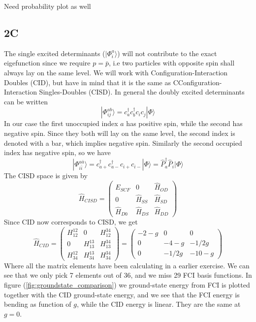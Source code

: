 \documentclass[norsk,a4paper,12pt]{article}
\begin{document}
Need probability plot as well

\subsection*{2C}
The single excited determinants ($|\Phi_i^a\rangle$) will not contribute to the exact eigefunction since we require $p=\bar{p}$, i.e two particles with opposite spin shall always lay on the same level. We will work with Configuration-Interaction Doubles (CID), but have in mind that it is the same as CConfiguration-Interaction Singles-Doubles (CISD). In general the doubly excited determinants can be written
\begin{equation}
|\Phi_{ij}^{ab}\rangle=c_a^{\dagger}c_b^{\dagger}c_ic_j|\Phi\rangle
\end{equation}
In our case the first unoccupied index $a$ has positive spin, while the second has negative spin. Since they both will lay on the same level, the second index is denoted with a bar, which implies negative spin. Similarly the second occupied index has negative spin, so we have
\begin{equation}
|\Phi_{i\bar{i}}^{a\bar{a}}\rangle=c_{a+}^{\dagger}c_{a-}^{\dagger}c_{i+}c_{i-}|\Phi\rangle=\hat{P}_a^{\dagger}\hat{P}_i|\Phi\rangle
\end{equation}
The CISD space is given by
\begin{equation}
\hat{H}_{CISD}=\begin{pmatrix}
E_{SCF}&0&\hat{H}_{OD}\\
0&\hat{H}_{SS}&\hat{H}_{SD}\\
\hat{H}_{D0}&\hat{H}_{DS}&\hat{H}_{DD}
\end{pmatrix}
\end{equation}
Since CID now corresponds to CISD, we get
\begin{equation}
\hat{H}_{CID}=\begin{pmatrix}
H_{12}^{12}&0&H_{12}^{34}\\
0&H_{13}^{13}&H_{13}^{34}\\
H_{34}^{12}&H_{34}^{13}&H_{34}^{34}
\end{pmatrix}=
\begin{pmatrix}
-2-g&0&0\\
0&-4-g&-1/2g\\
0&-1/2g&-10-g
\end{pmatrix}
\end{equation}
Where all the matrix elements have been calculating in a earlier exercise. We can see that we only pick 7 elements out of 36, and we miss 29 FCI basis functions. In figure (\ref{fig:groundstate_comparison}) we ground-state energy from FCI is plotted together with the CID ground-state energy, and we see that the FCI energy is bending as function of $g$, while the CID energy is linear. They are the same at $g=0$.
\end{document}
